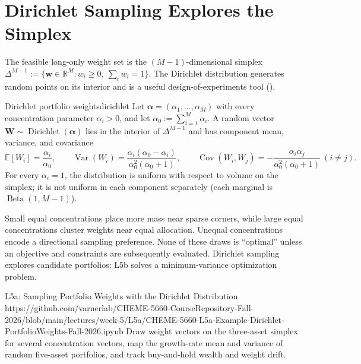 \documentclass[11pt]{article}
\newcommand{\E}{\mathbb{E}}
\newcommand{\R}{\mathbb{R}}
\begin{document}
\section{Dirichlet Sampling Explores the Simplex}

The feasible long-only weight set is the $(M-1)$-dimensional simplex $\Delta^{M-1}:=\{\mathbf w\in\R^M:w_i\geq0,\ \sum_iw_i=1\}$. The Dirichlet distribution generates random points on its interior and is a useful design-of-experiments tool ().

\begin{definition}{Dirichlet portfolio weights}{dirichlet}
Let $\boldsymbol\alpha=(\alpha_1,\ldots,\alpha_M)$ with every concentration parameter $\alpha_i>0$, and let $\alpha_0:=\sum_{i=1}^{M}\alpha_i$. A random vector $\mathbf W\sim\operatorname{Dirichlet}(\boldsymbol\alpha)$ lies in the interior of $\Delta^{M-1}$ and has component mean, variance, and covariance
\begin{equation}
  \label{eq:dirichlet-moments}
  \E[W_i]=\frac{\alpha_i}{\alpha_0},
  \qquad
  \operatorname{Var}(W_i)=
  \frac{\alpha_i(\alpha_0-\alpha_i)}
  {\alpha_0^2(\alpha_0+1)},
  \qquad
  \operatorname{Cov}(W_i,W_j)=-\frac{\alpha_i\alpha_j}{\alpha_0^2(\alpha_0+1)}\ (i\neq j).
\end{equation}
For every $\alpha_i=1$, the distribution is uniform with respect to volume on the simplex; it is not uniform in each component separately (each marginal is $\operatorname{Beta}(1,M-1)$).
\end{definition}

Small equal concentrations place more mass near sparse corners, while large equal concentrations cluster weights near equal allocation. Unequal concentrations encode a directional sampling preference. None of these draws is ``optimal'' unless an objective and constraints are subsequently evaluated. Dirichlet sampling explores candidate portfolios; L5b solves a minimum-variance optimization problem.

\notebooklink
  {L5a: Sampling Portfolio Weights with the Dirichlet Distribution}
  {https://github.com/varnerlab/CHEME-5660-CourseRepository-Fall-2026/blob/main/lectures/week-5/L5a/CHEME-5660-L5a-Example-Dirichlet-PortfolioWeights-Fall-2026.ipynb}
  {Draw weight vectors on the three-asset simplex for several concentration vectors, map the growth-rate mean and variance of random five-asset portfolios, and track buy-and-hold wealth and weight drift.}
\end{document}
